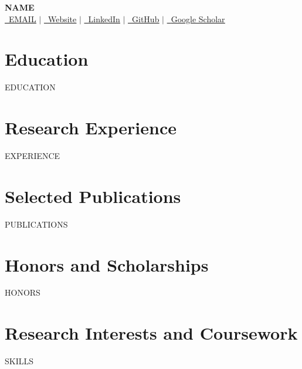\documentclass[letterpaper,10pt]{article}
\newcommand{\resumeSubHeadingListStart}{\begin{itemize}[leftmargin=0.15in, label={}]}
\newcommand{\resumeSubHeadingListEnd}{\end{itemize}}
\begin{document}
\begin{center}
    \textbf{\Huge \scshape {{NAME}}} \\ \vspace{1pt}
    \small
    \href{mailto:{{EMAIL}}}{\faEnvelope\ \underline{ {{EMAIL}}}} $|$
    \href{{{WEBSITE}}}{\faGlobe\ \underline{Website}} $|$
    \href{https://linkedin.com/in/{{LINKEDIN}}}{\faLinkedin\ \underline{LinkedIn}} $|$
    \href{https://github.com/{{GITHUB}}}{\faGithub\ \underline{GitHub}} $|$
    \href{https://scholar.google.com/citations?user={{SCHOLAR}}}{\aiGoogleScholar\ \underline{Google Scholar}}
\end{center}

\section{Education}
  \resumeSubHeadingListStart
{{EDUCATION}}
  \resumeSubHeadingListEnd

\section{Research Experience}
  \resumeSubHeadingListStart
{{EXPERIENCE}}
  \resumeSubHeadingListEnd

\section{Selected Publications}
  \begin{itemize}[leftmargin=0.35in, labelsep=0pt, labelwidth=0pt, itemindent=-0.2in, itemsep=0pt, label={}]
{{PUBLICATIONS}}
  \end{itemize}

\section{Honors and Scholarships}
  \resumeSubHeadingListStart
{{HONORS}}
  \resumeSubHeadingListEnd

\section{Research Interests and Coursework}
 \begin{itemize}[leftmargin=0.15in, label={}]
    \small{\item{
     {{SKILLS}}
    }}
 \end{itemize}

\end{document}
